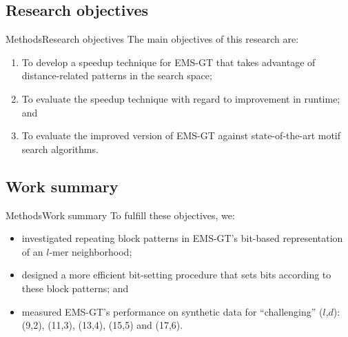 \documentclass[pdf,xcolor={dvipsnames}]{beamer}
\begin{document}
	\subsection{Research objectives}
	\begin{frame}{Methods}{Research objectives}
		The main objectives of this research are:\newline
		\begin{enumerate}
		\item To develop a speedup technique for EMS-GT that takes advantage of distance-related patterns in the search space;
		\newline
		\item To evaluate the speedup technique with regard to improvement in runtime; and\newline
		\item To evaluate the improved version of EMS-GT against state-of-the-art motif search algorithms.
		\end{enumerate}
		\end{frame}
	
	\subsection{Work summary}
	\begin{frame}{Methods}{Work summary}
		To fulfill these objectives, we:\newline
		\begin{itemize}
		\item %
		investigated repeating block patterns in EMS-GT's bit-based representation of an $l$-mer neighborhood;\newline

		\item designed a more efficient bit-setting procedure that sets bits according to these block patterns; and\newline
		
		\item measured EMS-GT's performance on synthetic data for ``challenging'' ($l$,$d$): (9,2), (11,3), (13,4), (15,5) and (17,6).
		\end{itemize}
		\end{frame}
\end{document}
